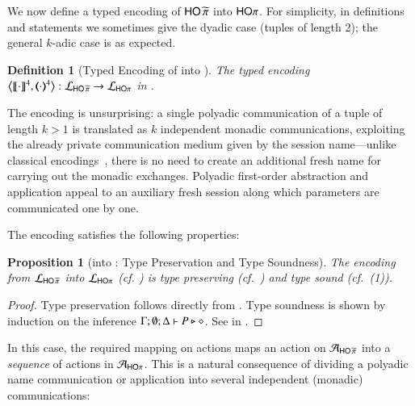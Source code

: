 \documentclass[preprint,11pt]{elsarticle}
\newtheorem{definition}{Definition}[section]
\newtheorem{proposition}{Proposition}[section]
\begin{document}
{We now define a typed encoding of 
$\mathsf{HO}\,{\widetilde{\pi}}$ into $\mathsf{HO}\pi$. For simplicity, in definitions and statements we sometimes give the dyadic case (tuples of length 2);
the general $k$-adic case is as expected.

\begin{definition}[Typed Encoding of \PHOp into \HOp]
\label{d:enc:phoptohop}
The typed encoding
	$\big\langle \llbracket\cdot\rrbracket^4, (\!\!\langle\cdot\rangle\!\!)^{4}\big\rangle: \mathcal{L}_{\mathsf{HO}\,{\widetilde{\pi}}} \to \mathcal{L}_{\mathsf{HO}\pi}$ 
in .
\end{definition}

The encoding is unsurprising: a single polyadic communication of a tuple of length $k > 1$
is translated as $k$ independent monadic communications, exploiting the already private communication medium given by the session name---unlike classical encodings~\cite{MilnerTR91}, there is no need to create an additional fresh name for carrying out the monadic exchanges.
Polyadic first-order abstraction and application appeal to an auxiliary fresh session along which   parameters are communicated one by one.

The encoding satisfies the following properties:


{
\begin{proposition}[\PHOp into \HOp: Type Preservation and Type Soundness]
\label{prop:typepres_pHOp_to_HOp}
The encoding from
		$\mathcal{L}_{\mathsf{HO}\,{\widetilde{\pi}}}$ into $\mathcal{L}_{\mathsf{HO}\pi}$ (cf. )
is type preserving (cf.~) and type sound (cf.~(1)).
\end{proposition}}

\begin{proof}
Type preservation follows directly from .
Type soundness is shown by  induction on the inference $\Gamma; \emptyset; \Delta \vdash P \triangleright \diamond$.
	See  in .
	\end{proof}
	
In this case, the required mapping on actions 
maps an action on $\mathcal{A}_{\mathsf{HO}\,{\widetilde{\pi}}}$ into a 
\emph{sequence} 
of actions in $\mathcal{A}_{\mathsf{HO}\pi}$.
This is a natural consequence of dividing a polyadic name communication or application into several
independent (monadic) communications:

}
\end{document}
